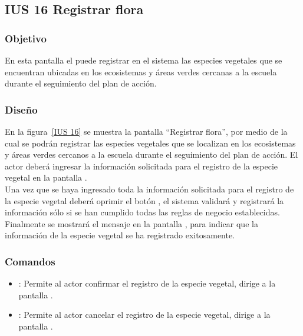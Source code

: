 \subsection{IUS 16 Registrar flora}

\subsubsection{Objetivo}

En esta pantalla el  puede registrar en el sistema las especies vegetales que se encuentran ubicadas en los ecosistemas y áreas verdes cercanas a la escuela durante el seguimiento del plan de acción.

\subsubsection{Diseño}

    En la figura~\ref{IUS 16} se muestra la pantalla ``Registrar flora'', por medio de la cual se podrán registrar las especies vegetales que se localizan en los ecosistemas y áreas verdes cercanos a la escuela durante el seguimiento del plan de acción. El actor deberá ingresar la información solicitada para el registro de la especie vegetal en la pantalla .\\
        
    Una vez que se haya ingresado toda la información solicitada para el registro de la especie vegetal deberá oprimir el botón , el sistema validará y registrará la información sólo si se han cumplido todas las reglas de negocio establecidas.\\
    
    Finalmente se mostrará el mensaje  en la pantalla , para indicar que la información de la especie vegetal se ha registrado exitosamente.
      

\subsubsection{Comandos}
    \begin{itemize}
    \item {}: Permite al actor confirmar el registro de la especie vegetal, dirige a la pantalla .
    \item {}: Permite al actor cancelar el registro de la especie vegetal, dirige a la pantalla .
    \end{itemize}

